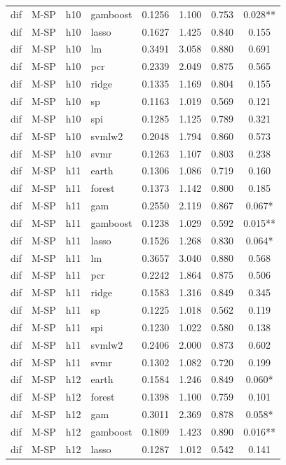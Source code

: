 \begin{ThreePartTable}
\begin{longtable}[t]{llclcccc}
dif & M-SP & h10 & gamboost & 0.1256 & 1.100 & 0.753 & 0.028**\\
dif & M-SP & h10 & lasso & 0.1627 & 1.425 & 0.840 & 0.155\\
dif & M-SP & h10 & lm & 0.3491 & 3.058 & 0.880 & 0.691\\
dif & M-SP & h10 & pcr & 0.2339 & 2.049 & 0.875 & 0.565\\
dif & M-SP & h10 & ridge & 0.1335 & 1.169 & 0.804 & 0.155\\
dif & M-SP & h10 & sp & 0.1163 & 1.019 & 0.569 & 0.121\\
dif & M-SP & h10 & spi & 0.1285 & 1.125 & 0.789 & 0.321\\
dif & M-SP & h10 & svmlw2 & 0.2048 & 1.794 & 0.860 & 0.573\\
dif & M-SP & h10 & svmr & 0.1263 & 1.107 & 0.803 & 0.238\\
\addlinespace
dif & M-SP & h11 & earth & 0.1306 & 1.086 & 0.719 & 0.160\\
dif & M-SP & h11 & forest & 0.1373 & 1.142 & 0.800 & 0.185\\
dif & M-SP & h11 & gam & 0.2550 & 2.119 & 0.867 & 0.067*\\
dif & M-SP & h11 & gamboost & 0.1238 & 1.029 & 0.592 & 0.015**\\
dif & M-SP & h11 & lasso & 0.1526 & 1.268 & 0.830 & 0.064*\\
dif & M-SP & h11 & lm & 0.3657 & 3.040 & 0.880 & 0.568\\
dif & M-SP & h11 & pcr & 0.2242 & 1.864 & 0.875 & 0.506\\
dif & M-SP & h11 & ridge & 0.1583 & 1.316 & 0.849 & 0.345\\
dif & M-SP & h11 & sp & 0.1225 & 1.018 & 0.562 & 0.119\\
dif & M-SP & h11 & spi & 0.1230 & 1.022 & 0.580 & 0.138\\
dif & M-SP & h11 & svmlw2 & 0.2406 & 2.000 & 0.873 & 0.602\\
dif & M-SP & h11 & svmr & 0.1302 & 1.082 & 0.720 & 0.199\\
\addlinespace
dif & M-SP & h12 & earth & 0.1584 & 1.246 & 0.849 & 0.060*\\
dif & M-SP & h12 & forest & 0.1398 & 1.100 & 0.759 & 0.101\\
dif & M-SP & h12 & gam & 0.3011 & 2.369 & 0.878 & 0.058*\\
dif & M-SP & h12 & gamboost & 0.1809 & 1.423 & 0.890 & 0.016**\\
dif & M-SP & h12 & lasso & 0.1287 & 1.012 & 0.542 & 0.141\\

\end{longtable}
\end{ThreePartTable}
